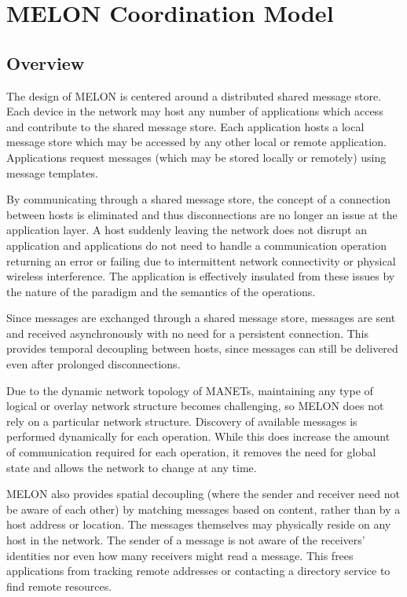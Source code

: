 \chapter{MELON Coordination Model}

\section{Overview}

The design of MELON is centered around a distributed shared message store. Each device in the network may host any number of applications which access and contribute to the shared message store. Each application hosts a local message store which may be accessed by any other local or remote application. Applications request messages (which may be stored locally or remotely) using message templates.

By communicating through a shared message store, the concept of a connection between hosts is eliminated and thus disconnections are no longer an issue at the application layer. A host suddenly leaving the network does not disrupt an application and applications do not need to handle a communication operation returning an error or failing due to intermittent network connectivity or physical wireless interference. The application is effectively insulated from these issues by the nature of the paradigm and the semantics of the operations.

Since messages are exchanged through a shared message store, messages are sent and received asynchronously with no need for a persistent connection. This provides temporal decoupling between hosts, since messages can still be delivered even after prolonged disconnections.

Due to the dynamic network topology of MANETs, maintaining any type of logical or overlay network structure becomes challenging, so MELON does not rely on a particular network structure. Discovery of available messages is performed dynamically for each operation. While this does increase the amount of communication required for each operation, it removes the need for global state and allows the network to change at any time.

MELON also provides spatial decoupling (where the sender and receiver need not be aware of each other) by matching messages based on content, rather than by a host address or location. The messages themselves may physically reside on any host in the network. The sender of a message is not aware of the receivers' identities nor even how many receivers might read a message. This frees applications from tracking remote addresses or contacting a directory service to find remote resources.

